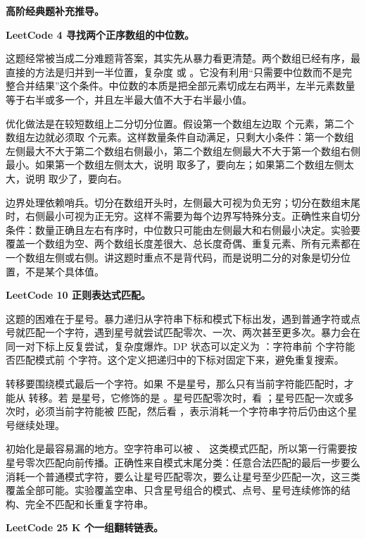\noindent\textbf{高阶经典题补充推导。}

\noindent\textbf{LeetCode 4 寻找两个正序数组的中位数。}

这题经常被当成二分难题背答案，其实先从暴力看更清楚。两个数组已经有序，最直接的方法是归并到一半位置，复杂度  或 。它没有利用“只需要中位数而不是完整合并结果”这个条件。中位数的本质是把全部元素切成左右两半，左半元素数量等于右半或多一个，并且左半最大值不大于右半最小值。

优化做法是在较短数组上二分切分位置。假设第一个数组左边取  个元素，第二个数组左边就必须取  个元素。这样数量条件自动满足，只剩大小条件：第一个数组左侧最大不大于第二个数组右侧最小，第二个数组左侧最大不大于第一个数组右侧最小。如果第一个数组左侧太大，说明  取多了，要向左；如果第二个数组左侧太大，说明  取少了，要向右。

边界处理依赖哨兵。切分在数组开头时，左侧最大可视为负无穷；切分在数组末尾时，右侧最小可视为正无穷。这样不需要为每个边界写特殊分支。正确性来自切分条件：数量正确且左右有序时，中位数只可能由左侧最大和右侧最小决定。实验要覆盖一个数组为空、两个数组长度差很大、总长度奇偶、重复元素、所有元素都在一个数组左侧或右侧。讲这题时重点不是背代码，而是说明二分的对象是切分位置，不是某个具体值。

\noindent\textbf{LeetCode 10 正则表达式匹配。}

这题的困难在于星号。暴力递归从字符串下标和模式下标出发，遇到普通字符或点号就匹配一个字符，遇到星号就尝试匹配零次、一次、两次甚至更多次。暴力会在同一对下标上反复尝试，复杂度爆炸。DP 状态可以定义为 ：字符串前  个字符能否匹配模式前  个字符。这个定义把递归中的下标对固定下来，避免重复搜索。

转移要围绕模式最后一个字符。如果  不是星号，那么只有当前字符能匹配时，才能从  转移。若  是星号，它修饰的是 。星号匹配零次时，看 ；星号匹配一次或多次时，必须当前字符能被  匹配，然后看 ，表示消耗一个字符串字符后仍由这个星号继续处理。

初始化是最容易漏的地方。空字符串可以被 、 这类模式匹配，所以第一行需要按星号零次匹配向前传播。正确性来自模式末尾分类：任意合法匹配的最后一步要么消耗一个普通模式字符，要么让星号匹配零次，要么让星号至少匹配一次，这三类覆盖全部可能。实验覆盖空串、只含星号组合的模式、点号、星号连续修饰的结构、完全不匹配和长重复字符串。

\noindent\textbf{LeetCode 25 K 个一组翻转链表。}

